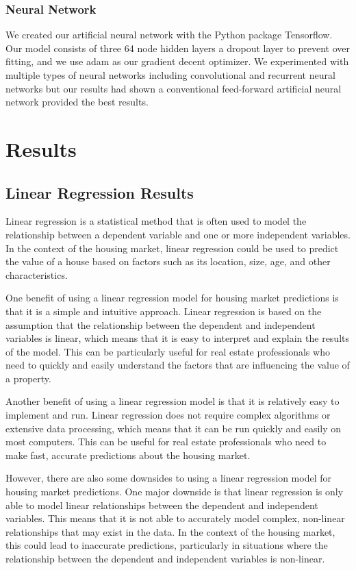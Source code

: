 \documentclass[11pt]{article}
\begin{document}
\subsubsection{Neural Network}

We created our artificial neural network with the Python package Tensorflow. Our model consists of three 64 node hidden layers a dropout layer to prevent over fitting, and we use adam as our gradient decent optimizer. 
We experimented with multiple types of neural networks including convolutional and recurrent neural networks but our results had shown a conventional feed-forward artificial neural network provided the best results. 

\section{Results}
\subsection{Linear Regression Results}
Linear regression is a statistical method that is often used to model the relationship between a dependent variable and one or more independent variables. In the context of the housing market, linear regression could be used to predict the value of a house based on factors such as its location, size, age, and other characteristics.

One benefit of using a linear regression model for housing market predictions is that it is a simple and intuitive approach. Linear regression is based on the assumption that the relationship between the dependent and independent variables is linear, which means that it is easy to interpret and explain the results of the model. This can be particularly useful for real estate professionals who need to quickly and easily understand the factors that are influencing the value of a property.

Another benefit of using a linear regression model is that it is relatively easy to implement and run. Linear regression does not require complex algorithms or extensive data processing, which means that it can be run quickly and easily on most computers. This can be useful for real estate professionals who need to make fast, accurate predictions about the housing market.

However, there are also some downsides to using a linear regression model for housing market predictions. One major downside is that linear regression is only able to model linear relationships between the dependent and independent variables. This means that it is not able to accurately model complex, non-linear relationships that may exist in the data. In the context of the housing market, this could lead to inaccurate predictions, particularly in situations where the relationship between the dependent and independent variables is non-linear.
\end{document}
